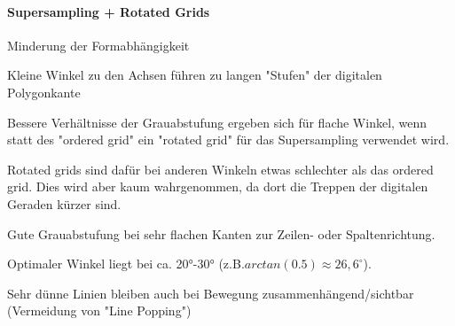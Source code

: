 \documentclass[landscape]{article}
\begin{document}
\begin{multicols}{3}
  \paragraph{Supersampling + Rotated Grids}
  \begin{itemize*}
    \item Minderung der Formabhängigkeit
    \item Kleine Winkel zu den Achsen führen zu langen "Stufen" der digitalen Polygonkante
    \item Bessere Verhältnisse der Grauabstufung ergeben sich für flache Winkel, wenn statt des "ordered grid" ein "rotated grid" für das Supersampling verwendet wird.
    \item Rotated grids sind dafür bei anderen Winkeln etwas schlechter als das ordered grid. Dies wird aber kaum wahrgenommen, da dort die Treppen der digitalen Geraden kürzer sind.
    \item Gute Grauabstufung bei sehr flachen Kanten zur Zeilen- oder Spaltenrichtung.
    \item Optimaler Winkel liegt bei ca. 20°-30° (z.B.$arctan(0.5) \approx 26,6^{\circ}$).
    \item Sehr dünne Linien bleiben auch bei Bewegung zusammenhängend/sichtbar (Vermeidung von "Line Popping")
  \end{itemize*}

\end{multicols}
\end{document}
